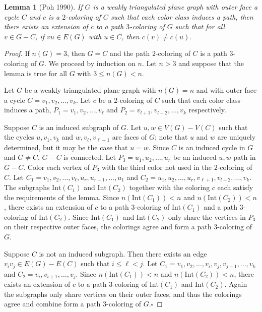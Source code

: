 \documentclass[12pt,letterpaper]{article}
\theoremstyle{plain}
\newtheorem{lemma}{Lemma}[section]           %
\theoremstyle{definition}
\theoremstyle{break}
\newcommand{\ggcqedsymbol}{$\square$}
\newcommand{\ggcqed}{\hbox{}\nobreak\hbox{\quad\ggcqedsymbol}}
\newcommand{\ggcnopf}{\ggcqed}
\begin{document}
\begin{lemma}[Poh 1990]\label{L:planar3c}
If $G$ is a weakly triangulated plane graph with outer face a
cycle $C$ and $c$ is a $2$-coloring of $C$ such
that each color class induces a path, then there exists an extension of
$c$ to a path $3$-coloring of $G$ such that for all $v\in G-C$, if $vu\in
E(G)$ with $u\in C$, then $c(v)\ne c(u)$.
\end{lemma}

\begin{proof}
If $n(G)=3$, then $G=C$ and the path $2$-coloring of $C$ is a path
$3$-coloring of $G$. We proceed by induction on $n$. Let $n>3$ and suppose
that the lemma is true for all $G$ with $3\le n(G)<n$.

Let $G$ be a weakly triangulated plane graph with $n(G)=n$ and with outer face a
cycle $C=v_1,v_2,\ldots, v_k$. Let $c$ be a $2$-coloring of $C$ such
that each color class induces a path, $P_1=v_1,v_2,\ldots, v_\ell$ and
$P_2=v_{l+1},v_{l+2},\ldots, v_k$ respectively.

Suppose $C$ is an induced subgraph of $G$. Let
$u,w\in V(G)-V(C)$ such that the cycles $u,v_1,v_k$ and $w,v_\ell,v_{\ell+1}$
are faces of $G$; note that
$u$ and $w$ are uniquely determined, but it may be the case that $u=w$. Since
$C$ is an induced cycle in $G$ and $G\ne C$, $G-C$ is connected.
Let $P_3=u_1,u_2,\ldots,u_r$ be an induced $u,w$-path in $G-C$.
Color each vertex of $P_3$ with the third color not used in the $2$-coloring of
$C$. Let $C_1=v_1,v_2,\ldots,v_\ell,u_r,u_{r-1},\ldots,u_1$ and
$C_2=u_1,u_2,\ldots,u_r,v_{\ell+1},v_{l+2},\ldots,v_k$. The subgraphs
$\text{Int}(C_1)$ and $\text{Int}(C_2)$ together with the coloring $c$
each satisfy the requirements of the lemma. Since $n(\text{Int}(C_1))<n$
and $n(\text{Int}(C_2))<n$, there exists an extension of $c$ to a path
$3$-coloring of $\text{Int}(C_1)$ and a path $3$-coloring of $\text{Int}(C_2)$.
Since $\text{Int}(C_1)$ and $\text{Int}(C_2)$ only share the vertices in $P_3$
on their respective outer faces, the colorings agree and form a path
$3$-coloring of $G$.

Suppose $C$ is not an induced subgraph. Then there
exists an edge $v_iv_j\in E(G)-E(C)$ such that $i\le \ell < j$. Let
$C_1=v_1,v_2,\ldots,v_i,v_j,v_{j+1},\ldots,v_k$
and $C_2=v_i,v_{i+1},\ldots,v_j$.
Since $n(\text{Int}(C_1))<n$
and $n(\text{Int}(C_2))<n$, there exists an extension of $c$ to a path
$3$-coloring of $\text{Int}(C_1)$ and $\text{Int}(C_2)$. Again
the subgraphs only share vertices on their outer faces, and thus the
colorings agree and combine form a path $3$-coloring of $G$.\ggcnopf
\end{proof}
\end{document}
